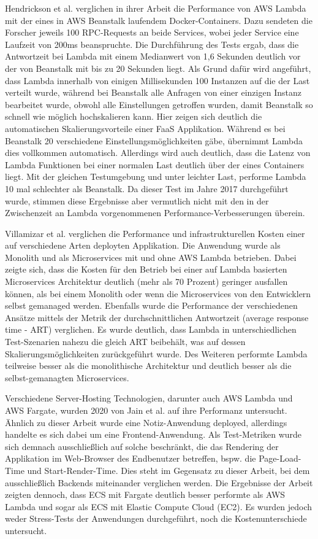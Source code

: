 Hendrickson et al. verglichen in ihrer Arbeit die Performance von AWS Lambda mit der eines in AWS Beanstalk laufendem Docker-Containers\cite{hendrickson_serverless_2017}. Dazu sendeten die Forscher jeweils 100 RPC-Requests an beide Services, wobei jeder Service eine Laufzeit von 200ms beanspruchte. Die Durchführung des Tests ergab, dass die Antwortzeit bei Lambda mit einem Medianwert von 1,6 Sekunden deutlich vor der von Beanstalk mit bis zu 20 Sekunden liegt. Als Grund dafür wird angeführt, dass Lambda innerhalb von einigen Millisekunden 100 Instanzen auf die der Last verteilt wurde, während bei Beanstalk alle Anfragen von einer einzigen Instanz bearbeitet wurde, obwohl alle Einstellungen getroffen wurden, damit Beanstalk so schnell wie möglich hochskalieren kann. Hier zeigen sich deutlich die automatischen Skalierungsvorteile einer FaaS Applikation. Während es bei Beanstalk 20 verschiedene Einstellungsmöglichkeiten gäbe, übernimmt Lambda dies vollkommen automatisch.
Allerdings wird auch deutlich, dass die Latenz von Lambda Funktionen bei einer normalen Last deutlich über der eines Containers liegt. Mit der gleichen Testumgebung und unter leichter Last, performe Lambda 10 mal schlechter als Beanstalk. Da dieser Test im Jahre 2017 durchgeführt wurde, stimmen diese Ergebnisse aber vermutlich nicht mit den in der Zwischenzeit an Lambda vorgenommenen Performance-Verbesserungen überein.

Villamizar et al. verglichen die Performance und infrastrukturellen Kosten einer auf verschiedene Arten deployten Applikation\cite{villamizar_infrastructure_2016}. Die Anwendung wurde als Monolith und als Microservices mit und ohne AWS Lambda betrieben. Dabei zeigte sich,  dass die Kosten für den Betrieb bei einer auf Lambda basierten Microservices Architektur deutlich (mehr als 70 Prozent) geringer ausfallen können, als bei einem Monolith oder wenn die Microservices von den Entwicklern selbst gemanaged werden. Ebenfalls wurde die Performance der verschiedenen Ansätze mittels der Metrik der durchschnittlichen Antwortzeit (average response time - ART) verglichen. Es wurde deutlich, dass Lambda in unterschiedlichen Test-Szenarien nahezu die gleich ART beibehält, was auf dessen Skalierungsmöglichkeiten zurückgeführt wurde. Des Weiteren performte Lambda teilweise besser als die monolithische Architektur und deutlich besser als die selbst-gemanagten Microservices.

Verschiedene Server-Hosting Technologien, darunter auch AWS Lambda und AWS Fargate, wurden 2020 von Jain et al. auf ihre Performanz untersucht. Ähnlich zu dieser Arbeit wurde eine Notiz-Anwendung deployed, allerdings handelte es sich dabei um eine Frontend-Anwendung. Als Test-Metriken wurde sich demnach ausschließlich auf solche beschränkt, die das Rendering der Applikation im Web-Browser des Endbenutzer betreffen, bspw. die Page-Load-Time und Start-Render-Time. Dies steht im Gegensatz zu dieser Arbeit, bei dem ausschließlich Backends miteinander verglichen werden. Die Ergebnisse der Arbeit zeigten dennoch, dass ECS mit Fargate deutlich besser performte als AWS Lambda und sogar als ECS mit Elastic Compute Cloud (EC2). Es wurden jedoch weder Stress-Tests der Anwendungen durchgeführt, noch die Kostenunterschiede untersucht.

